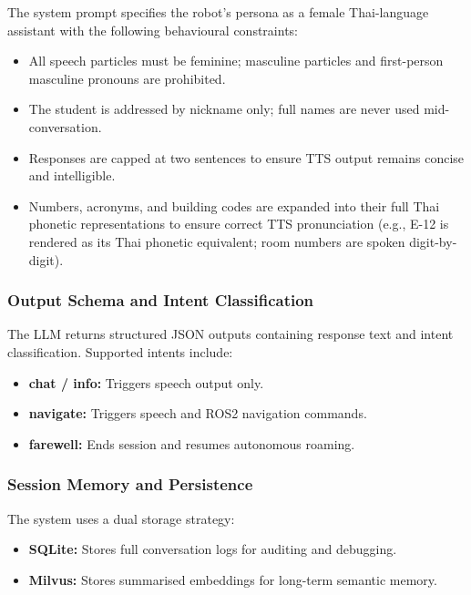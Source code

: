 The system prompt specifies the robot's persona as a female Thai-language assistant with the following behavioural constraints:

\begin{itemize}
    \item All speech particles must be feminine; masculine particles and first-person masculine pronouns are prohibited.

    \item The student is addressed by nickname only; full names are never used mid-conversation.

    \item Responses are capped at two sentences to ensure TTS output remains concise and intelligible.

    \item Numbers, acronyms, and building codes are expanded into their full Thai phonetic representations to ensure correct TTS pronunciation (e.g., E-12 is rendered as its Thai phonetic equivalent; room numbers are spoken digit-by-digit).
\end{itemize}

\subsubsection{Output Schema and Intent Classification}

The LLM returns structured JSON outputs containing response text and intent classification. Supported intents include:

\begin{itemize}
    \item \textbf{chat / info:} Triggers speech output only.
    \item \textbf{navigate:} Triggers speech and ROS2 navigation commands.
    \item \textbf{farewell:} Ends session and resumes autonomous roaming.
\end{itemize}

\subsubsection{Session Memory and Persistence}

The system uses a dual storage strategy:

\begin{itemize}
    \item \textbf{SQLite:} Stores full conversation logs for auditing and debugging.
    \item \textbf{Milvus:} Stores summarised embeddings for long-term semantic memory.
\end{itemize}

